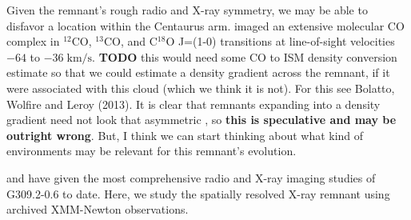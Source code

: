 \documentclass[preprint2,tighten,trackchanges]{aastex6}
\newcommand*{\mt}{\mathrm}
\newcommand*{\unit}[1]{\;\mt{#1}}  %
\begin{document}
Given the remnant's rough radio and X-ray symmetry, we may be able to disfavor
a location within the Centaurus arm.  \citet{saito2001} imaged
an extensive molecular CO complex in ${}^{12}$CO, ${}^{13}$CO, and C${}^{18}$O
J=(1-0) transitions at line-of-sight velocities $-64$ to $-36 \unit{km/s}$.
\textbf{TODO} this would need some CO to ISM density conversion estimate so
that we could estimate a density gradient across the remnant, if it were
associated with this cloud (which we think it is not).
For this see Bolatto, Wolfire and Leroy (2013).
It is clear that remnants expanding into a density gradient need not look that
asymmetric \citep{williams2013}, so \textbf{this is speculative and may be
outright wrong}.
But, I think we can start thinking about what kind of environments may be
relevant for this remnant's evolution.
%




 and  have given the most
comprehensive radio and X-ray imaging studies of G309.2-0.6 to date.
Here, we study the spatially resolved X-ray remnant using archived XMM-Newton
observations.

%
%
%
%
%
%
%
\end{document}

